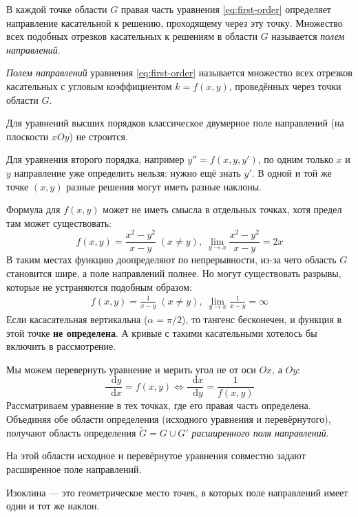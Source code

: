 \documentclass[12pt,a4paper]{article}
\numberwithin{equation}{section}
\newcommand{\dd}{\mathop{}\!\mathrm{d}}
\begin{document}
В каждой точке области \(G\) правая часть уравнения \eqref{eq:first-order} определяет направление касательной к решению, проходящему через эту точку. Множество всех подобных отрезков касательных к решениям в области \(G\) называется \textit{полем направлений}.

\begin{definitionHSE}
\textit{Полем направлений} уравнения \eqref{eq:first-order} называется множество всех отрезков касательных с угловым коэффициентом \(k=f(x,y)\), проведённых через точки области \(G\).
\end{definitionHSE}

\begin{remarkHSE}
Для уравнений высших порядков классическое двумерное поле направлений (на плоскости \(xOy\)) не строится.

Для уравнения второго порядка, например $y''=f(x,y,y')$, по одним только \(x\) и \(y\) направление уже определить нельзя: нужно ещё знать \(y'\). В одной и той же точке \((x,y)\) разные решения могут иметь разные наклоны.
\end{remarkHSE}

Формула для \(f(x,y)\) может не иметь смысла в отдельных точках, хотя предел там может существовать:
\[
f(x,y)=\frac{x^2-y^2}{x-y}\;(x\neq y),\;\lim_{y\rightarrow x}\frac{x^2-y^2}{x-y}=2x
\]
В таким местах функцию доопределяют по непрерывности, из-за чего область \(G\) становится шире, а поле направлений полнее. Но могут существовать разрывы, которые не устраняются подобным образом:
\begin{gather*}
f(x,y)=\frac{1}{x-y}\;(x\neq y),\;\lim_{y\rightarrow x}\frac{1}{x-y}=\infty
\end{gather*}
Если касасательная вертикальна (\(\alpha=\pi/2\)), то тангенс бесконечен, и функция в этой точке \textbf{не определена}. А кривые с такими касательными хотелось бы включить в рассмотрение.

Мы можем перевернуть уравнение и мерить угол не от оси \(Ox\), а \(Oy\):
\[
\frac{\dd y}{\dd x}=f(x,y)\iff\frac{\dd x}{\dd y}=\frac{1}{f(x,y)}
\]
Рассматриваем уравнение в тех точках, где его правая часть определена. Объединяя обе области определения (исходного уравнения и перевёрнутого), получают область определения \(\tilde{G} = G \cup G'\) \textit{расширенного поля направлений}.

На этой области исходное и перевёрнутое уравнения совместно задают расширенное поле направлений.

\begin{definitionHSE}
Изоклина --- это геометрическое место точек, в которых поле направлений имеет один и тот же наклон.
\end{definitionHSE}
\end{document}
